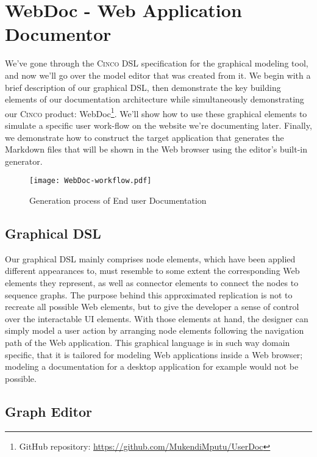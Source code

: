 \chapter{WebDoc - Web Application Documentor}\label{ch:CP}

We've gone through the \textsc{Cinco} DSL specification for the graphical modeling tool, and now we'll go over the model editor that was created from it. We begin with a brief description of our graphical DSL, then demonstrate the key building elements of our documentation architecture while simultaneously demonstrating our \textsc{Cinco} product: WebDoc\footnote{GitHub repository: \url{https://github.com/MukendiMputu/UserDoc}}. We'll show how to use these graphical elements to simulate a specific user work-flow on the website we're documenting later. Finally, we demonstrate how to construct the target application that generates the Markdown files that will be shown in the Web browser using the editor's built-in generator.

\begin{figure}[h]
    \centering
    \texttt{[image: WebDoc-workflow.pdf]}
    \caption{Generation process of End user Documentation}
    \label{fig:WebDocWorkflow}
\end{figure}

\section{Graphical DSL}\label{sec:gDSL}

Our graphical DSL mainly comprises node elements, which have been applied different appearances to, must resemble to some extent the corresponding Web elements they represent, as well as connector elements to connect the nodes to sequence graphs. The purpose behind this approximated replication is not to recreate all possible Web elements, but to give the developer a sense of control over the interactable UI elements. With those elements at hand, the designer can simply model a user action by arranging node elements following the navigation path of the Web application. This graphical language is in such way domain specific, that it is tailored for modeling Web applications inside a Web browser; modeling a documentation for a desktop application for example would not be possible.

\section{Graph Editor}\label{sec:graphEditor}

